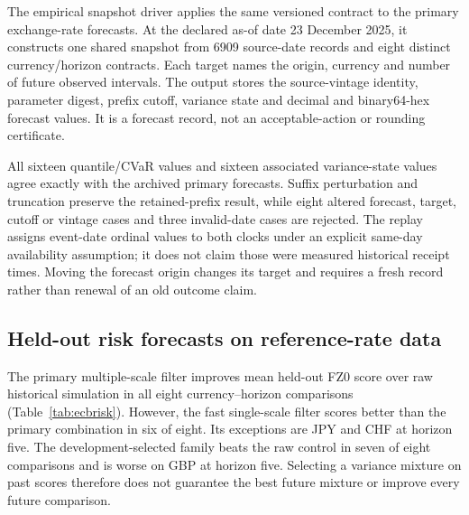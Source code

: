 \documentclass[11pt,a4paper]{article}
\theoremstyle{definition}\newtheorem{definition}[theorem]{Definition}
\begin{document}
The empirical snapshot driver applies the same versioned contract to the primary exchange-rate forecasts. At the declared as-of date 23 December 2025, it constructs one shared snapshot from 6909 source-date records and eight distinct currency/horizon contracts. Each target names the origin, currency and number of future observed intervals. The output stores the source-vintage identity, parameter digest, prefix cutoff, variance state and decimal and binary64-hex forecast values. It is a forecast record, not an acceptable-action or rounding certificate.

All sixteen quantile/CVaR values and sixteen associated variance-state values agree exactly with the archived primary forecasts. Suffix perturbation and truncation preserve the retained-prefix result, while eight altered forecast, target, cutoff or vintage cases and three invalid-date cases are rejected. The replay assigns event-date ordinal values to both clocks under an explicit same-day availability assumption; it does not claim those were measured historical receipt times. Moving the forecast origin changes its target and requires a fresh record rather than renewal of an old outcome claim.

\subsection{Held-out risk forecasts on reference-rate data}\label{sec:ecbresults}
\begin{table}[!htbp]\centering\small
\caption{Mean held-out FZ0 score on the 2020--2025 ECB-based log-loss targets; smaller is better. Fast and slow use half-lives 20 and 120. Multi is the predeclared equal-weight variance combination. Selected uses the weight $w$ chosen on completed 2010--2019 outcomes. Results are descriptive and losses share temporal observations.}\label{tab:ecbrisk}

\end{table}
The primary multiple-scale filter improves mean held-out FZ0 score over raw historical simulation in all eight currency--horizon comparisons (Table~\ref{tab:ecbrisk}). However, the fast single-scale filter scores better than the primary combination in six of eight. Its exceptions are JPY and CHF at horizon five. The development-selected family beats the raw control in seven of eight comparisons and is worse on GBP at horizon five. Selecting a variance mixture on past scores therefore does not guarantee the best future mixture or improve every future comparison.
\end{document}

